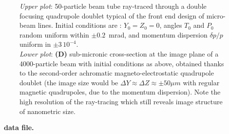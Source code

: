 \begin{figure}[H]
  \caption[FigC71]{\label{figC71} %
  \textit{Upper plot}: 50-particle beam tube ray-traced through a double focusing quadrupole 
doublet typical of the front end design of micro-beam lines. Initial conditions are : 
$Y_0 = Z_0 = 0$, angles $T_0$ and $P_0$ random uniform within $\pm0.2$~mrad, and momentum 
dispersion $\delta p/p$ uniform in $\pm 3\, 10^{-4}$. \\ %
\textit{Lower plot}: \textbf{(D)} sub-micronic cross-section at the image plane of 
a 4000-particle beam with initial conditions as above, obtained thanks to the second-order 
achromatic magneto-electrostatic quadrupole doublet (the image size would be $\Delta Y \approx 
\Delta Z \approx \pm 50 \mu m$ with regular magnetic quadrupoles, due to 
the momentum dispersion). Note the high resolution 
of the ray-tracing which still reveals image structure of nanometric size.
  }
\end{figure}
\vfill 

\clearpage
\noindent \textbf{\zgoubi\ data file.}


